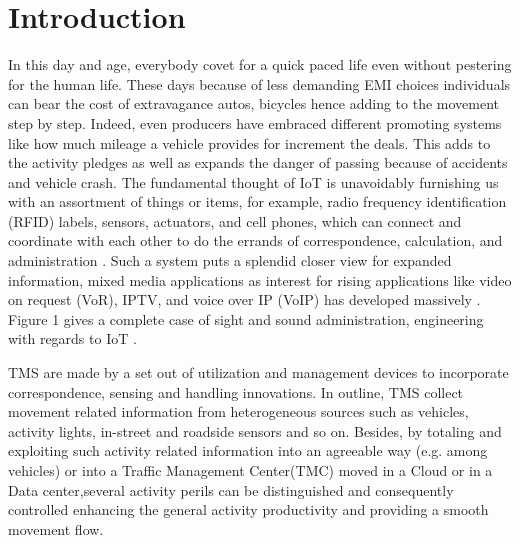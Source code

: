 \documentclass[conference]{IEEEtran}
\begin{document}
\section{Introduction}
In this day and age, everybody covet for a quick paced life even without pestering for the human life. These days because of less demanding EMI choices individuals can bear the cost of extravagance autos, bicycles hence adding to the movement step by step. Indeed, even producers have embraced different promoting systems like how much mileage a vehicle provides for increment the deals. This adds to the activity pledges as well as expands the danger of passing because of accidents and vehicle crash.
The fundamental thought of IoT is unavoidably furnishing us with an assortment of things or items, for example, radio frequency identification (RFID) labels, sensors, actuators, and cell phones, which can connect and coordinate with each other to do the errands of correspondence, calculation, and administration \cite{Multimedia:chao}. Such a system puts a splendid closer view for expanded information, mixed media applications as interest for rising applications like video on request (VoR), IPTV, and voice over IP (VoIP) has developed massively \cite{SecuringCloudServers:Chapade}. Figure 1 gives a complete case of sight and sound administration, engineering with regards to IoT \cite{Multimedia:chao}.
  
  TMS are made by a set out of utilization and management devices to incorporate correspondence, sensing and handling innovations. In outline, TMS collect movement related information from heterogeneous sources such as vehicles, activity lights, in-street and roadside sensors and so on. Besides, by totaling and exploiting such activity related information into an agreeable way (e.g. among vehicles)  \cite{VehicularNetworking:Karagiannis}  or into a Traffic Management Center(TMC) moved in a Cloud or in a Data center,several activity perils can be distinguished and consequently controlled enhancing the general activity productivity and providing a smooth movement flow.
  
\end{document}
